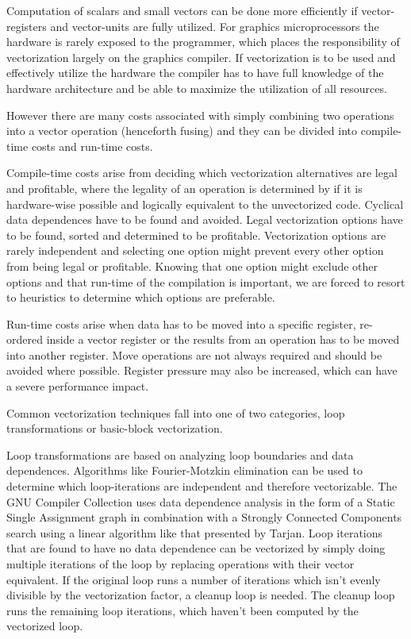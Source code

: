 \documentclass[12pt,a4paper,onecolumn,twoside,openright]{report}
\begin{document}
Computation of scalars and small vectors can be done more efficiently if vector-registers and vector-units are fully utilized. For graphics microprocessors the hardware is rarely exposed to the programmer, which places the responsibility of vectorization largely on the graphics compiler. If vectorization is to be used and effectively utilize the hardware the compiler has to have full knowledge of the hardware architecture and be able to maximize the utilization of all resources.

However there are many costs associated with simply combining two operations into a vector operation (henceforth fusing) and they can be divided into compile-time costs and run-time costs.

Compile-time costs arise from deciding which vectorization alternatives are legal and profitable, where the legality of an operation is determined by if it is hardware-wise possible and logically equivalent to the unvectorized code. Cyclical data dependences have to be found and avoided. Legal vectorization options have to be found, sorted and determined to be profitable. Vectorization options are rarely independent and selecting one option might prevent every other option from being legal or profitable. Knowing that one option might exclude other options and that run-time of the compilation is important, we are forced to resort to heuristics to determine which options are preferable.

Run-time costs arise when data has to be moved into a specific register, re-ordered inside a vector register or the results from an operation has to be moved into another register. Move operations are not always required and should be avoided where possible. Register pressure may also be increased, which can have a severe performance impact.


Common vectorization techniques fall into one of two categories, loop transformations or basic-block vectorization.

Loop transformations are based on analyzing loop boundaries and data dependences. Algorithms like Fourier-Motzkin elimination\cite{aho2007compilers} can be used to determine which loop-iterations are independent and therefore vectorizable. The GNU Compiler Collection uses data dependence analysis in the form of a Static Single Assignment \cite{cytron1991efficiently}\cite{naishlos2004autovectorization} graph in combination with a Strongly Connected Components search using a linear algorithm like that presented by Tarjan\cite{tarjan1972depth}. Loop iterations that are found to have no data dependence can be vectorized by simply doing multiple iterations of the loop by replacing operations with their vector equivalent. If the original loop runs a number of iterations which isn't evenly divisible by the vectorization factor, a cleanup loop is needed. The cleanup loop runs the remaining loop iterations, which haven't been computed by the vectorized loop.
\end{document}

